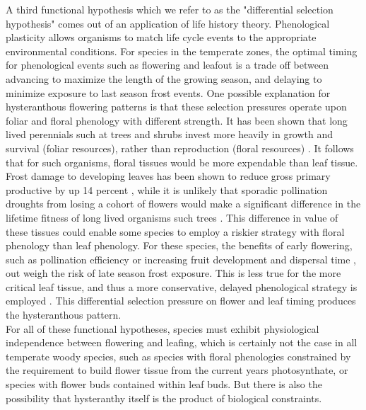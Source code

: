 \documentclass{article}\usepackage[]{graphicx}\usepackage[]{color}
\begin{document}
\indent A third functional hypothesis which we refer to as the "differential selection hypothesis" comes out of an application of life history theory. Phenological plasticity allows organisms to match life cycle events to the appropriate environmental conditions. For species in the temperate zones, the optimal timing for phenological events such as flowering and leafout is a trade off between advancing to maximize the length of the growing season, and delaying to minimize exposure to last season frost events\citep{Kramer1995}. One possible explanation for hysteranthous flowering patterns is that these selection pressures operate upon foliar and floral phenology with different strength. It has been shown that long lived perennials such at trees and shrubs invest more heavily in growth and survival (foliar resources), rather than reproduction (floral resources) \citep{Franco2004}. It follows that for such organisms, floral tissues would be more expendable than leaf tissue. Frost damage to developing leaves has been shown to reduce gross primary productive by up 14 percent \citep{Hufkins2012}, while it is unlikely that sporadic pollination droughts from losing a cohort of flowers would make a significant difference in the lifetime fitness of long lived organisms such trees \citep{Knight2005}. This difference in value of these tissues could enable some species to employ a riskier strategy with floral phenology than leaf phenology. For these species, the benefits of early flowering, such as pollination efficiency or increasing fruit development and dispersal time \citep{Primack1987}, out weigh the risk of late season frost exposure. This is less true for the more critical leaf tissue, and thus a more conservative, delayed phenological strategy is employed \citep{Lenz2013}. This differential selection pressure on flower and leaf timing produces the hysteranthous pattern.\\
\indent For all of these functional hypotheses, species must exhibit physiological independence between flowering and leafing, which is certainly not the case in all temperate woody species, such as species with floral phenologies constrained by the requirement to build flower tissue from the current years photosynthate, or species with flower buds contained within leaf buds. But there is also the possibility that hysteranthy itself is the product of biological constraints.\\
\end{document}
